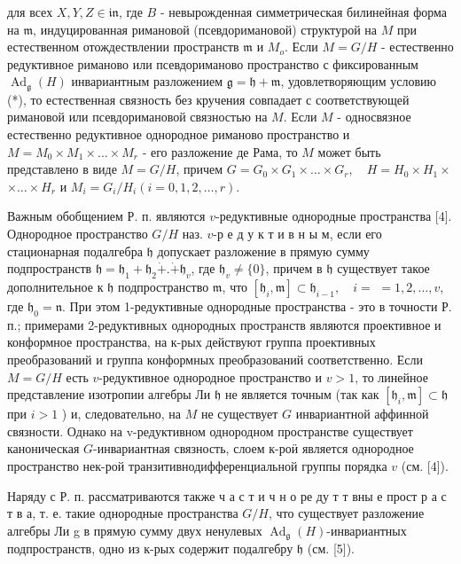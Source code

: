 \documentclass[10pt]{article}
\begin{document}
для всех $X, Y, Z \in \mathfrak{i n}$, где $B$ - невырожденная симметрическая билинейная форма на $\mathfrak{m}$, индуцированная римановой (псевдоримановой) структурой на $M$ при естественном отождествлении пространств $\mathfrak{m}$ и $M_{o}$. Если $M=G / H$ - естественно редуктивное риманово или псевдориманово пространство с фиксированным $\operatorname{Ad}_{\mathfrak{g}}(H)$ инвариантным разложением $\mathfrak{g}=\mathfrak{h}+\mathfrak{m}$, удовлетворяющим условию (*), то естественная связность без кручения совпадает с соответствующей римановой или псевдоримановой связностью на $M$. Если $M$ - односвязное естественно редуктивное однородное риманово пространство и $M=M_{0} \times M_{1} \times \ldots \times M_{r}$ - его разложение де Рама, то $M$ может быть представлено в виде $M=G / H$, причем $G=G_{0} \times G_{1} \times \ldots \times G_{r}, \quad H=H_{0} \times H_{1} \times$ $\times \ldots \times H_{r}$ и $M_{i}=G_{i} / H_{i}(i=0,1,2, \ldots, r)$.



Важным обобщением Р. п. являются $v$-редуктивные однородные пространства [4]. Однородное пространство $G / H$ наз. $v$-р е д у к т и в н ы м, если его стационарная подалгебра $\mathfrak{h}$ допускает разложение в прямую сумму подпространств $\mathfrak{h}=\mathfrak{h}_{1}+\mathfrak{h}_{2} \dot{+} . \dot{+} \mathfrak{h}_{v}$, где $\mathfrak{h}_{v} \neq\{0\}$, причем в $\mathfrak{h}$ существует такое дополнительное к $\mathfrak{h}$ подпространство $\mathfrak{m}$, что $\left[\mathfrak{h}_{i}, \mathfrak{m}\right] \subset \mathfrak{h}_{i-1}, \quad i=$ $=1,2, \ldots, v$, где $\mathfrak{h}_{0}=\mathfrak{n}$. При этом 1-редуктивные однородные пространства - это в точности Р. п.; примерами 2-редуктивных однородных пространств являются проективное и конформное пространства, на к-рых действуют группа проективных преобразований и группа конформных преобразований соответственно. Если $M=G / H$ есть $v$-редуктивное однородное пространство и $v>1$, то линейное представление изотропии алгебры Ли $\mathfrak{h}$ не является точным (так как $\left[\mathfrak{h}_{i}, \mathfrak{m}\right] \subset \mathfrak{h}$ при $i>1$ ) и, следовательно, на $M$ не существует $G$ инвариантной аффинной связности. Однако на v-редуктивном однородном пространстве существует каноническая $G$-инвариантная связность, слоем к-роӥ является однородное пространство нек-рой транзитивнодифференциальной группы порядка $v$ (см. [4]).



Наряду с Р. п. рассматриваются также ч а с т и ч н о ре ду т т вны е прост р а с т в а, т. е. такие однородные пространства $G / H$, что существует разложение алгебры Ли g в прямую сумму двух ненулевых $\operatorname{Ad}_{\mathfrak{g}}(H)$-инвариантных подпространств, одно из к-рых содержит подалгебру $\mathfrak{h}$ (см. [5]).
\end{document}
